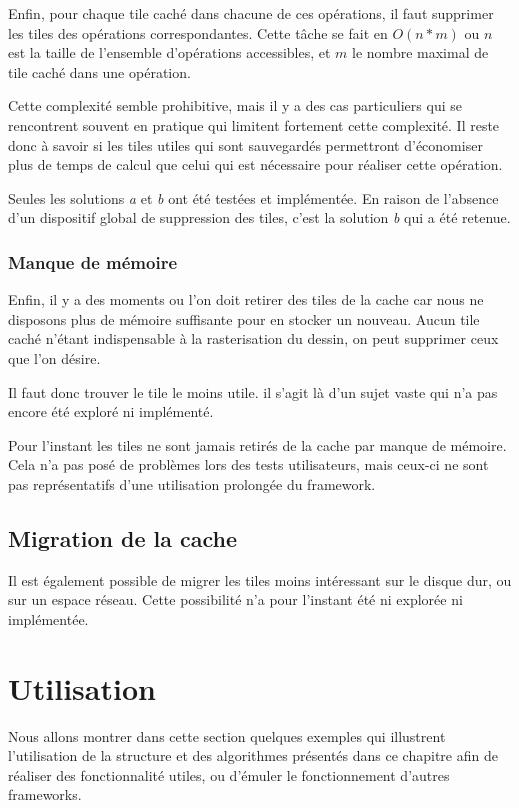 				Enfin, pour chaque tile caché dans chacune de ces opérations, il faut supprimer les tiles des opérations correspondantes.
				Cette tâche se fait en $O(n*m)$ ou $n$ est la taille de l'ensemble d'opérations accessibles, et $m$ le nombre maximal de
				tile caché dans une opération. 

				Cette complexité semble prohibitive, mais il y a des cas particuliers qui se rencontrent souvent en pratique qui limitent
				fortement cette complexité. Il reste donc à savoir si les tiles utiles qui sont sauvegardés permettront 
				d'économiser plus de temps de calcul que celui qui est nécessaire pour réaliser cette opération. 

			Seules les solutions \emph{a} et \emph{b} ont été testées et implémentée. En raison de l'absence d'un dispositif global de suppression
			des tiles, c'est la solution \emph{b} qui a été retenue. 

			\subsubsection{Manque de mémoire}
			Enfin, il y a des moments ou l'on doit retirer des tiles de la cache car nous ne disposons plus de mémoire suffisante
			pour en stocker un nouveau. Aucun tile caché n'étant indispensable à la rasterisation du dessin, on peut supprimer ceux que l'on désire.
			
			Il faut donc trouver le tile le moins utile. il s'agit là d'un sujet vaste qui n'a pas encore été exploré
			ni implémenté. 
			
			Pour l'instant les tiles ne sont jamais retirés de la cache par manque de mémoire. Cela n'a pas posé de problèmes lors
			des tests utilisateurs, mais ceux-ci ne sont pas représentatifs d'une utilisation prolongée du framework. 

		\subsection{Migration de la cache}
			Il est également possible de migrer les tiles moins intéressant sur le disque dur, ou sur un espace réseau.
			Cette possibilité n'a pour l'instant été ni explorée ni implémentée.

	\section{Utilisation}
		Nous allons montrer dans cette section quelques exemples qui illustrent l'utilisation de la structure et des algorithmes présentés
		dans ce chapitre afin de réaliser des fonctionnalité utiles, ou d'émuler le fonctionnement d'autres frameworks. 
